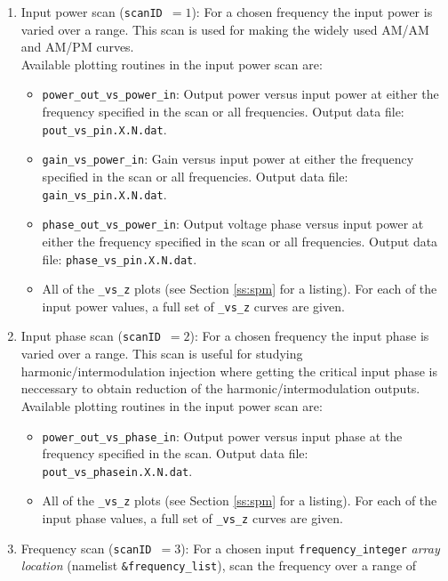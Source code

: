 \documentclass{article}
\begin{document}
\begin{enumerate}
\item Input power scan ({\tt scanID}~$=1$): For a chosen frequency the
  input power is varied over a range.
  This scan is used for making the widely used AM/AM and AM/PM curves.\\
  Available plotting routines in the input power scan are:
  \begin{itemize}
  \item {\tt power\_out\_vs\_power\_in}: Output power versus input power at
    either the frequency specified in the scan or all frequencies.
    Output data file: {\tt pout\_vs\_pin.X.N.dat}.
  \item {\tt gain\_vs\_power\_in}: Gain versus input power at either
    the frequency specified in the scan or all frequencies.
    Output data file: {\tt gain\_vs\_pin.X.N.dat}.
  \item {\tt phase\_out\_vs\_power\_in}: Output voltage phase versus input
    power at either the frequency specified in the scan or all frequencies.
    Output data file: {\tt phase\_vs\_pin.X.N.dat}.
  \item All of the {\tt *\_vs\_z} plots (see Section \ref{ss:spm} for a
    listing). For each of the input power values, a full set of
    {\tt *\_vs\_z} curves are given.
  \end{itemize}
\item Input phase scan ({\tt scanID}~$=2$): For a chosen frequency the
  input phase is varied over a range. This scan is useful for studying
  harmonic/intermodulation injection where getting the critical input phase
  is neccessary to obtain reduction of the harmonic/intermodulation outputs.\\
  Available plotting routines in the input power scan are:
  \begin{itemize}
  \item {\tt power\_out\_vs\_phase\_in}: Output power versus input phase at
    the frequency specified in the scan.
    Output data file: {\tt pout\_vs\_phasein.X.N.dat}.
  \item All of the {\tt *\_vs\_z} plots (see Section \ref{ss:spm} for a
    listing). For each of the input phase values, a full set of
    {\tt *\_vs\_z} curves are given.
  \end{itemize}
\item Frequency scan ({\tt scanID}~$=3$): For a chosen input
  {\tt frequency\_integer} {\em array location}
  (namelist {\tt \&frequency\_list}), scan the frequency over a range of

\end{enumerate}
\end{document}
